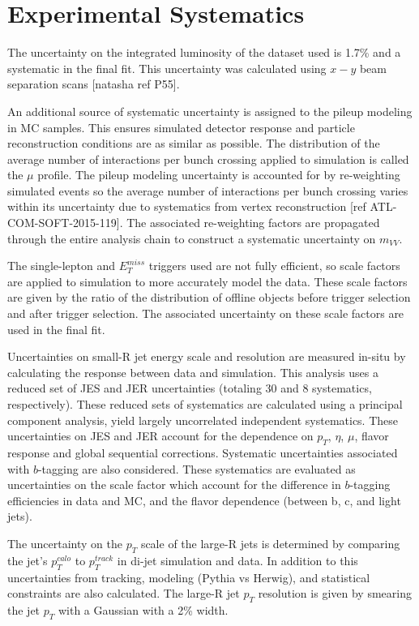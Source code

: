 \section{Experimental Systematics}
The uncertainty on the integrated luminosity of the dataset used is 1.7\% and a systematic in the final fit. This uncertainty was calculated using $x-y$ beam separation scans [natasha ref P55]. 

An additional source of systematic uncertainty is assigned to the pileup modeling in MC samples. This ensures simulated detector response and particle reconstruction conditions are as similar as possible. The distribution of the average number of interactions per bunch crossing applied to simulation is called the $\mu$ profile. The pileup modeling uncertainty is accounted for by re-weighting simulated events so the average number of interactions per bunch crossing varies within its uncertainty due to systematics from vertex reconstruction [ref ATL-COM-SOFT-2015-119]. The associated re-weighting factors are propagated through the entire analysis chain to construct a systematic uncertainty on $m_{VV}$.

The single-lepton and $E_{T}^{miss}$ triggers used are not fully efficient, so scale factors are applied to simulation to more accurately model the data. These scale factors are given by the ratio of the distribution of offline objects before trigger selection and after trigger selection. The associated uncertainty on these scale factors are used in the final fit.

Uncertainties on small-R jet energy scale and resolution are measured in-situ by calculating the response between data and simulation. This analysis uses a reduced set of JES and JER uncertainties (totaling 30 and 8 systematics, respectively). These reduced sets of systematics are calculated using a principal component analysis, yield largely uncorrelated independent systematics. These uncertainties on JES and JER account for the dependence on $p_{T}$, $\eta$, $\mu$, flavor response and global sequential corrections. Systematic uncertainties associated with $b$-tagging are also considered. These systematics are evaluated as uncertainties on the scale factor which account for the difference in $b$-tagging efficiencies in data and MC, and the flavor dependence (between b, c, and light jets). 

The uncertainty on the $p_{T}$ scale of the large-R jets is determined by comparing the jet's $p_{T}^{calo}$ to $p_{T}^{track}$ in di-jet simulation and data. In addition to this uncertainties from tracking, modeling (Pythia vs Herwig), and statistical constraints are also calculated. The large-R jet $p_{T}$ resolution is given by smearing the jet $p_{T}$ with a Gaussian with a 2\% width.

